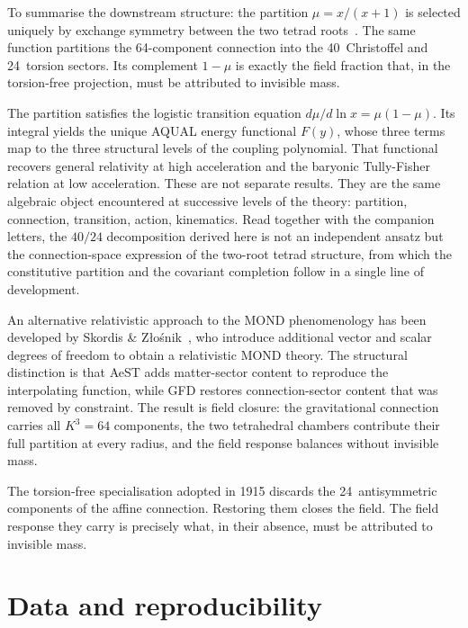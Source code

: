 \documentclass[twocolumn]{iopjournal}
\begin{document}
To summarise the downstream structure: the partition
$\mu = x/(x{+}1)$ is selected uniquely by exchange symmetry
between the two tetrad roots~\cite{Nelson2026b}.  The same
function partitions the 64-component connection into the
40~Christoffel and 24~torsion sectors.  Its complement
$1 - \mu$ is exactly the field fraction that, in the
torsion-free projection, must be attributed to invisible mass.

The partition satisfies the logistic transition equation
$d\mu/d\!\ln x = \mu(1{-}\mu)$.  Its integral yields the
unique AQUAL energy functional $F(y)$, whose three terms map
to the three structural levels of the coupling polynomial.
That functional recovers general relativity at high
acceleration and the baryonic Tully-Fisher relation at low
acceleration.  These are not separate results.  They are the
same algebraic object encountered at successive levels of the
theory: partition, connection, transition, action, kinematics.
Read together with the companion letters, the $40/24$
decomposition derived here is not an independent ansatz but
the connection-space expression of the two-root tetrad
structure, from which the constitutive partition and the
covariant completion follow in a single line of development.

An alternative relativistic approach to the MOND phenomenology
has been developed by Skordis \&
Z\l{}o\'{s}nik~\cite{SkordisZlosnik2021}, who introduce
additional vector and scalar degrees of freedom to obtain a
relativistic MOND theory.  The structural distinction is that
AeST adds matter-sector content to reproduce the interpolating
function, while GFD restores connection-sector content that
was removed by constraint.  The result is field closure: the
gravitational connection carries all $K^3 = 64$ components,
the two tetrahedral chambers contribute their full partition
at every radius, and the field response balances without
invisible mass.

The torsion-free specialisation adopted in 1915 discards the
24~antisymmetric components of the affine connection.
Restoring them closes the field.  The field response they
carry is precisely what, in their absence, must be attributed
to invisible mass.


\section{Data and reproducibility}
\end{document}
